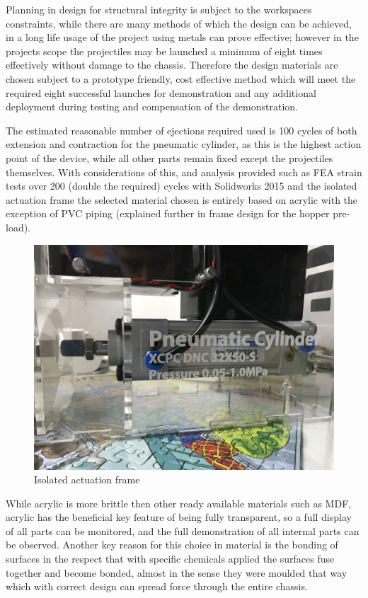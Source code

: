 \documentclass[a4paper, 10pt]{IEEEconf}
\begin{document}
Planning in design for structural integrity is subject to the workspaces constraints, while there are many methods of which the design can be achieved, in a long life usage of the project using metals can prove effective; however in the projects scope the projectiles may be launched a minimum of eight times effectively without damage to the chassis. Therefore the design materials are chosen subject to a prototype friendly, cost effective method which will meet the required eight successful launches for demonstration and any additional deployment during testing and compensation of the demonstration. 

The estimated reasonable number of ejections required used is 100 cycles of both extension and contraction for the pneumatic cylinder, as this is the highest action point of the device, while all other parts remain fixed except the projectiles themselves. With considerations of this, and analysis provided such as FEA strain tests over 200 (double the required) cycles with Solidworks 2015 and the isolated actuation frame the selected material chosen is entirely based on acrylic with the exception of PVC piping (explained further in frame design for the hopper pre-load). 

\begin{figure}[H]
  \includegraphics[width=\linewidth]{images/cylinder}
  \caption{Isolated actuation frame}
  \label{fig:Isolated actuation frame}
\end{figure}

While acrylic is more brittle then other ready available materials such as MDF, acrylic has the beneficial key feature of being fully transparent, so a full display of all parts can be monitored, and the full demonstration of all internal parts can be observed. Another key reason for this choice in material is the bonding of surfaces in the respect that with specific chemicals applied the surfaces fuse together and become bonded, almost in the sense they were moulded that way which with correct design can spread force through the entire chassis.
\end{document}
